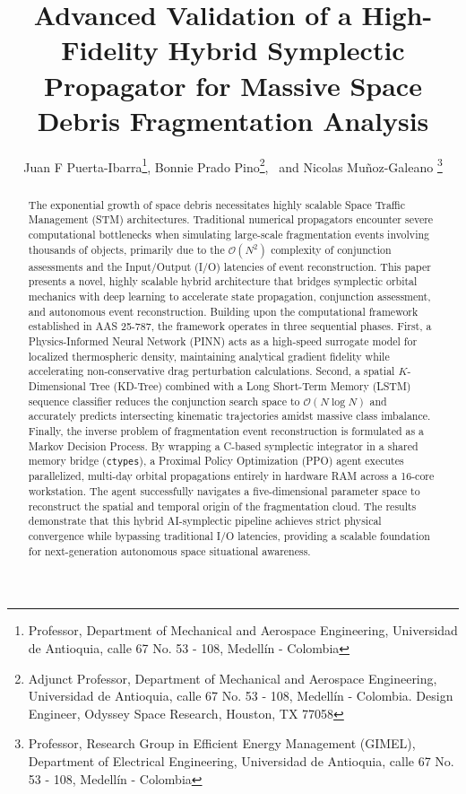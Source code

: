 \documentclass[letterpaper,11pt]{AAS}
\begin{document}
\title{Advanced Validation of a High-Fidelity Hybrid Symplectic Propagator for Massive Space Debris Fragmentation Analysis}

\author{Juan F Puerta-Ibarra\thanks{Professor, Department of Mechanical and Aerospace Engineering, Universidad de Antioquia, calle 67 No. 53 - 108, Medellín - Colombia},  
Bonnie Prado Pino\thanks{Adjunct Professor, Department of Mechanical and Aerospace Engineering, Universidad de Antioquia, calle 67 No. 53 - 108, Medellín - Colombia. Design Engineer, Odyssey Space Research, Houston, TX 77058},
\ and Nicolas Muñoz-Galeano \thanks{Professor, Research Group in Efficient Energy Management (GIMEL), Department of Electrical Engineering, Universidad de Antioquia, calle 67 No. 53 - 108, Medellín - Colombia}
}

\maketitle

\begin{abstract}
The exponential growth of space debris necessitates highly scalable Space Traffic Management (STM) architectures. Traditional numerical propagators encounter severe computational bottlenecks when simulating large-scale fragmentation events involving thousands of objects, primarily due to the $\mathcal{O}(N^2)$ complexity of conjunction assessments and the Input/Output (I/O) latencies of event reconstruction. This paper presents a novel, highly scalable hybrid architecture that bridges symplectic orbital mechanics with deep learning to accelerate state propagation, conjunction assessment, and autonomous event reconstruction. Building upon the computational framework established in AAS 25-787, the framework operates in three sequential phases. First, a Physics-Informed Neural Network (PINN) acts as a high-speed surrogate model for localized thermospheric density, maintaining analytical gradient fidelity while accelerating non-conservative drag perturbation calculations. Second, a spatial $K$-Dimensional Tree (KD-Tree) combined with a Long Short-Term Memory (LSTM) sequence classifier reduces the conjunction search space to $\mathcal{O}(N \log N)$ and accurately predicts intersecting kinematic trajectories amidst massive class imbalance. Finally, the inverse problem of fragmentation event reconstruction is formulated as a Markov Decision Process. By wrapping a C-based symplectic integrator in a shared memory bridge (\texttt{ctypes}), a Proximal Policy Optimization (PPO) agent executes parallelized, multi-day orbital propagations entirely in hardware RAM across a 16-core workstation. The agent successfully navigates a five-dimensional parameter space to reconstruct the spatial and temporal origin of the fragmentation cloud. The results demonstrate that this hybrid AI-symplectic pipeline achieves strict physical convergence while bypassing traditional I/O latencies, providing a scalable foundation for next-generation autonomous space situational awareness.
\end{abstract}
\end{document}
